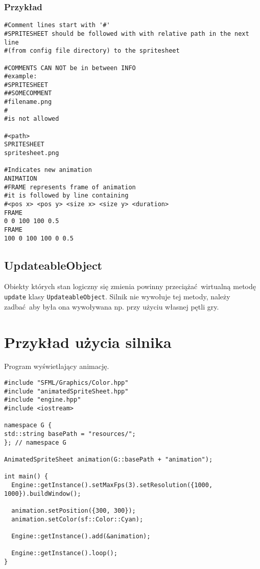 \documentclass[11pt]{article}
\begin{document}
\subsubsection{Przykład}
\label{sec:org9916a42}
\begin{verbatim}
#Comment lines start with '#'
#SPRITESHEET should be followed with with relative path in the next line
#(from config file directory) to the spritesheet

#COMMENTS CAN NOT be in between INFO
#example:
#SPRITESHEET
##SOMECOMMENT
#filename.png
#
#is not allowed

#<path>
SPRITESHEET
spritesheet.png

#Indicates new animation
ANIMATION
#FRAME represents frame of animation
#it is followed by line containing
#<pos x> <pos y> <size x> <size y> <duration>
FRAME
0 0 100 100 0.5
FRAME
100 0 100 100 0 0.5
\end{verbatim}
\subsection{UpdateableObject}
\label{sec:org1e37079}
Obiekty których stan logiczny się zmienia powinny przeciążać wirtualną metodę \texttt{update} klasy \texttt{UpdateableObject}.
Silnik nie wywołuje tej metody, należy zadbać aby była ona wywoływana np. przy użyciu własnej pętli gry.
\section{Przykład użycia silnika}
\label{sec:org062f28d}
Program wyświetlający animację.

\begin{verbatim}
#include "SFML/Graphics/Color.hpp"
#include "animatedSpriteSheet.hpp"
#include "engine.hpp"
#include <iostream>

namespace G {
std::string basePath = "resources/";
}; // namespace G

AnimatedSpriteSheet animation(G::basePath + "animation");

int main() {
  Engine::getInstance().setMaxFps(3).setResolution({1000, 1000}).buildWindow();

  animation.setPosition({300, 300});
  animation.setColor(sf::Color::Cyan);

  Engine::getInstance().add(&animation);

  Engine::getInstance().loop();
}
\end{verbatim}
\end{document}

